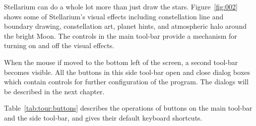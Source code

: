 Stellarium can do a whole lot more than just draw the stars. Figure~\ref{fig:002}
shows some of Stellarium's visual effects including constellation
line and boundary drawing, constellation art, planet hints, and
atmospheric halo around the bright Moon. The controls in the main tool-bar
provide a mechanism for turning on and off the visual effects.

When the mouse if moved to the bottom left of the screen, a second
tool-bar becomes visible. All the buttons in this side tool-bar open
and close dialog boxes which contain controls for further
configuration of the program. The dialogs will be described in the
next chapter.


Table~\ref{tab:tour:buttons} describes the operations of buttons
on the main tool-bar and the side tool-bar, and gives their default
keyboard shortcuts.


